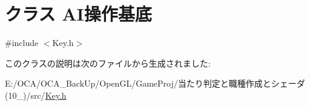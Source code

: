 \hypertarget{class_a_i_xE6_x93_x8D_xE4_xBD_x9C_xE5_x9F_xBA_xE5_xBA_x95}{\section{クラス A\-I操作基底}
\label{class_a_i_xE6_x93_x8D_xE4_xBD_x9C_xE5_x9F_xBA_xE5_xBA_x95}
}


{\ttfamily \#include $<$Key.\-h$>$}



このクラスの説明は次のファイルから生成されました\-:\begin{DoxyCompactItemize}
\item 
E\-:/\-O\-C\-A/\-O\-C\-A\-\_\-\-Back\-Up/\-Open\-G\-L/\-Game\-Proj/当たり判定と職種作成とシェーダ(10\-\_)/src/\hyperlink{_key_8h}{Key.\-h}\end{DoxyCompactItemize}

